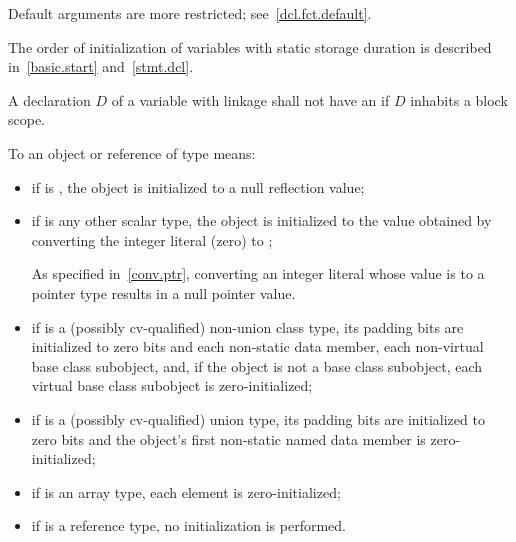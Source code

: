 \pnum
\begin{note}
Default arguments are more restricted; see~\ref{dcl.fct.default}.
\end{note}

\pnum
\begin{note}
The order of initialization of variables with static storage duration is described in~\ref{basic.start}
and~\ref{stmt.dcl}.
\end{note}

\pnum
A declaration $D$ of a variable with linkage
shall not have an 
if $D$ inhabits a block scope.

\pnum
{}%
%
%
To 
an object or reference of type  means:
\begin{itemize}
\item
if  is ,
the object is initialized to a null reflection value;
\item
if  is any other scalar type,
the object is initialized to the value
obtained by converting the integer literal  (zero) to ;
\begin{footnote}
As specified in~\ref{conv.ptr}, converting an integer
literal whose value is
to a pointer type results in a null pointer value.
\end{footnote}

\item
if
is a (possibly cv-qualified) non-union class type,
its padding bits are initialized to zero bits and
each non-static data member,
each non-virtual base class subobject, and,
if the object is not a base class subobject,
each virtual base class subobject
is zero-initialized;

\item
if
is a (possibly cv-qualified) union type,
its padding bits are initialized to zero bits and
the
object's first non-static named
data member
is zero-initialized;

\item
if
is an array type,
each element is zero-initialized;
\item
if
is a reference type, no initialization is performed.
\end{itemize}

